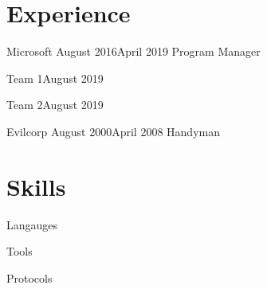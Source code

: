 \documentclass[]{../resume}
\author{Caleb Thorsteinson}
\begin{document}

\section{Experience}

\begin{employer}[../microsoft]{Microsoft} {August 2016}{April 2019} {Program Manager}
\begin{team}{Team 1}{August 2019}
    \lipsum[1]
\end{team}
\begin{team}{Team 2}{August 2019}
    \lipsum[2]
\end{team}
\end{employer}

\begin{employer}{Evilcorp} {August 2000}{April 2008} {Handyman}
  \lipsum[5]
\end{employer}

\newcolumn


\section{Skills}

\begin{skilltable}{Langauges}
\end{skilltable}

\begin{skilltable}{Tools}
\end{skilltable}

\begin{skilltable}{Protocols}
\end{skilltable}
    
\end{document}
